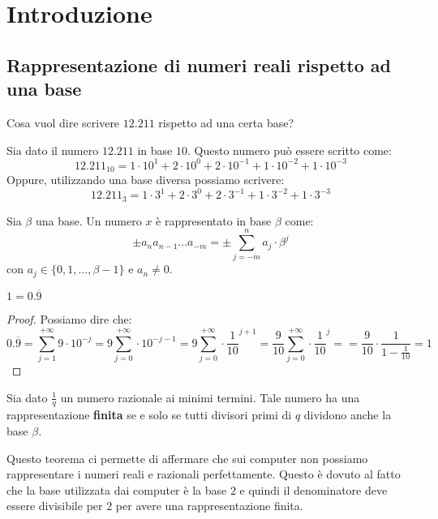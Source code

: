\chapter{Introduzione}
\section{Rappresentazione di numeri reali rispetto ad una base}
\begin{esempio}
    Cosa vuol dire scrivere $12.211$ rispetto ad una certa base?

    Sia dato il numero $12.211$ in base $10$. Questo numero può essere scritto
    come:
    \begin{equation*}
        12.211_{10} = 1\cdot 10^1+2\cdot 10^0 +2 \cdot 10^{-1} + 1 \cdot 10^{-2}
        + 1 \cdot 10^{-3}
    \end{equation*}
    Oppure, utilizzando una base diversa possiamo scrivere:
    \begin{equation*}
        12.211_{3} = 1\cdot 3^1+2\cdot 3^0 +2 \cdot 3^{-1} + 1 \cdot 3^{-2}
        + 1 \cdot 3^{-3}
    \end{equation*}
\end{esempio}
\begin{definizione}
    Sia $\beta$ una base. Un numero $x$ è rappresentato in base $\beta$ come:
    \begin{equation}
        \pm a_n a_{n-1} \dots a_{-m} = \pm \sum_{j = -m}^{n} a_j \cdot \beta^j
    \end{equation}
    con $a_j \in \{0, 1, \dots, \beta-1\}$ e $a_n \neq 0$.
\end{definizione}
\begin{teorema}
    $1=0.\overline{9}$
    \begin{proof}
        Possiamo dire che:
        \begin{equation*}
            0.\overline{9} = \sum_{j = 1}^{+ \infty} 9 \cdot 10^{-j} = 9
            \sum_{j=0}^{+\infty} \cdot 10^{-j-1} = 9 \sum_{j = 0}^{+\infty} \cdot
            \frac{1}{10}^{j+1} = \frac{9}{10} \sum _{j=0}^{+\infty} \cdot \frac{1}{10}^{j} =
            = \frac{9}{10} \cdot \frac{1}{1-\frac{1}{10}} = 1
        \end{equation*}
    \end{proof}
\end{teorema}
\begin{teorema}
    Sia dato $\frac{1}{q}$ un numero razionale ai minimi termini. Tale numero ha
    una rappresentazione \textbf{finita} se e solo se tutti divisori primi di $q$
    dividono anche la base $\beta$.
\end{teorema}
Questo teorema ci permette di affermare che sui computer non possiamo
rappresentare i numeri reali e razionali perfettamente. Questo è dovuto al fatto
che la base utilizzata dai computer è la base $2$ e quindi il denominatore deve
essere divisibile per $2$ per avere una rappresentazione finita.
